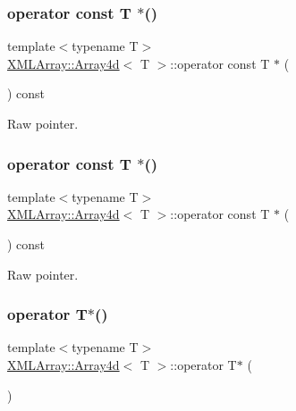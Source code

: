 \subsubsection{\texorpdfstring{operator const T $\ast$()}{operator const T *()}\hspace{0.1cm}{\footnotesize\ttfamily [2/3]}}
{\footnotesize\ttfamily template$<$typename T$>$ \\
\mbox{\hyperlink{classXMLArray_1_1Array4d}{X\+M\+L\+Array\+::\+Array4d}}$<$ T $>$\+::operator const T $\ast$ (\begin{DoxyParamCaption}{ }\end{DoxyParamCaption}) const\hspace{0.3cm}{\ttfamily [inline]}}



Raw pointer. 

\mbox{\label{classXMLArray_1_1Array4d_abe07755f692bf1df5acf5b8b9cd266cb}} 
\subsubsection{\texorpdfstring{operator const T $\ast$()}{operator const T *()}\hspace{0.1cm}{\footnotesize\ttfamily [3/3]}}
{\footnotesize\ttfamily template$<$typename T$>$ \\
\mbox{\hyperlink{classXMLArray_1_1Array4d}{X\+M\+L\+Array\+::\+Array4d}}$<$ T $>$\+::operator const T $\ast$ (\begin{DoxyParamCaption}{ }\end{DoxyParamCaption}) const\hspace{0.3cm}{\ttfamily [inline]}}



Raw pointer. 

\mbox{\label{classXMLArray_1_1Array4d_a25e918248c9191d04788cce2e0116bf1}} 
\subsubsection{\texorpdfstring{operator T$\ast$()}{operator T*()}\hspace{0.1cm}{\footnotesize\ttfamily [1/3]}}
{\footnotesize\ttfamily template$<$typename T$>$ \\
\mbox{\hyperlink{classXMLArray_1_1Array4d}{X\+M\+L\+Array\+::\+Array4d}}$<$ T $>$\+::operator T$\ast$ (\begin{DoxyParamCaption}{ }\end{DoxyParamCaption})\hspace{0.3cm}{\ttfamily [inline]}}



